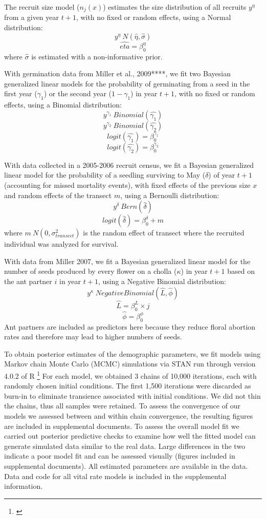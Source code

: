\documentclass[11pt]{article}
\newcommand{\tom}[2]{{\color{red}{#1}}\footnote{\textit{\color{red}{#2}}}}
\begin{document}
The recruit size model ($n_j(x)$) estimates the size distribution of all recruits $y^{\eta}$ from a given year $t+1$, with no fixed or random effects, using a Normal distribution: 
$$y^{\eta} ~ N(\hat{\eta},\hat{\sigma})$$
$$\hat{eta} = \beta_{0}^{\eta}$$
where $\hat{\sigma}$ is estimated with a non-informative prior. 

With germination data from Miller et al., 2009****, we fit two Bayesian generalized linear models for the probability of germinating from a seed in the first year ($\gamma_1$) or the second year ($1 - \gamma_1$) in year $t+1$, with no fixed or random effects, using a Binomial distribution:
$$y^{\gamma_1} ~ Binomial(\hat{\gamma_1})$$
$$y^{\gamma_2} ~ Binomial(\hat{\gamma_2})$$
$$logit(\hat{\gamma_1}) = \beta_{0}^{\gamma_1}$$
$$logit(\hat{\gamma_2}) = \beta_{0}^{\gamma_2}$$

With data collected in a 2005-2006 recruit census, we fit a Bayesian generalized linear model for the probability of a seedling surviving to May ($\delta$) of year $t+1$ (accounting for missed mortality events), with fixed effects of the previous size $x$ and random effects of the transect $m$, using a Bernoulli distribution: 
$$y^{\delta} ~ Bern(\hat{\delta})$$
$$logit(\hat{\delta}) = \beta_{0}^{\delta} + m$$
 where $m ~ N(0, \sigma_{transect}^2)$ is the random effect of transect where the recruited individual was analyzed for survival.

With data from Miller 2007, we fit a Bayesian generalized linear model for the number of seeds produced by every flower on a cholla ($\kappa$) in year $t+1$ based on the ant partner $i$ in year $t+1$, using a Negative Binomial distribution:
$$y^{\kappa} ~ Negative Binomial(\hat{L},\hat{\phi})$$
$$\hat{L} = \beta_{0}^{L} \times j$$
$$\hat{\phi} = \beta_{0}^{\phi}$$
Ant partners are included as predictors here because they reduce floral abortion rates and therefore may lead to higher numbers of seeds. 

To obtain posterior estimates of the demographic parameters, we fit models using Markov chain Monte Carlo (MCMC) simulations via STAN run through version 4.0.2 of R \tom{}{You need to cite R and RStan}
For each model, we obtained 3 chains of 10,000 iterations, each with randomly chosen initial conditions. 
The first 1,500 iterations were discarded as burn-in to eliminate transience associated with initial conditions. 
We did not thin the chains, thus all samples were retained. 
To assess the convergence of our models we assessed between and within chain convergence, the resulting figures are included in supplemental documents. 
To assess the overall model fit we carried out posterior predictive checks to examine how well the fitted model can generate simulated data similar to the real data.
Large differences in the two indicate a poor model fit and can be assessed visually (figures included in supplemental documents). 
All estimated parameters are available in the data. 
Data and code for all vital rate models is included in the supplemental information.
\end{document}

